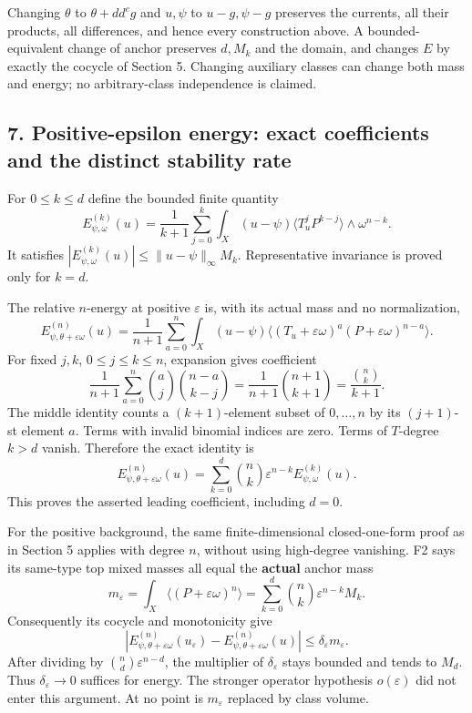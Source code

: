 \documentclass[
  10pt,
]{article}
\begin{document}
Changing \(\theta\) to \(\theta+dd^cg\) and \(u,\psi\) to \(u-g,\psi-g\)
preserves the currents, all their products, all differences, and hence
every construction above. A bounded-equivalent change of anchor
preserves \(d,M_k\) and the domain, and changes \(E\) by exactly the
cocycle of Section 5. Changing auxiliary classes can change both mass
and energy; no arbitrary-class independence is claimed.

\subsection{7. Positive-epsilon energy: exact coefficients and the
distinct stability
rate}\label{positive-epsilon-energy-exact-coefficients-and-the-distinct-stability-rate}

For \(0\leq k\leq d\) define the bounded finite quantity \[
E^{(k)}_{\psi,\omega}(u)=\frac1{k+1}\sum_{j=0}^k\int_X(u-\psi)
\langle T_u^jP^{k-j}\rangle\wedge\omega^{n-k}.
\] It satisfies \(|E^{(k)}_{\psi,\omega}(u)|\leq\|u-\psi\|_\infty M_k\).
Representative invariance is proved only for \(k=d\).

The relative \(n\)-energy at positive \(\varepsilon\) is, with its
actual mass and no normalization, \[
E^{(n)}_{\psi,\theta+\varepsilon\omega}(u)
=\frac1{n+1}\sum_{a=0}^n\int_X(u-\psi)
\langle(T_u+\varepsilon\omega)^a(P+\varepsilon\omega)^{n-a}\rangle.
\] For fixed \(j,k\), \(0\leq j\leq k\leq n\), expansion gives
coefficient \[
\frac1{n+1}\sum_{a=0}^n\binom aj\binom{n-a}{k-j}
=\frac1{n+1}\binom{n+1}{k+1}
=\frac{\binom nk}{k+1}.
\] The middle identity counts a \((k+1)\)-element subset of
\({0,\ldots,n}\) by its \((j+1)\)-st element \(a\). Terms with invalid
binomial indices are zero. Terms of \(T\)-degree \(k>d\) vanish.
Therefore the exact identity is \[
E^{(n)}_{\psi,\theta+\varepsilon\omega}(u)
=\sum_{k=0}^d\binom nk\varepsilon^{n-k}E^{(k)}_{\psi,\omega}(u).
\] This proves the asserted leading coefficient, including \(d=0\).

For the positive background, the same finite-dimensional closed-one-form
proof as in Section 5 applies with degree \(n\), without using
high-degree vanishing. F2 says its same-type top mixed masses all equal
the \textbf{actual} anchor mass \[
m_\varepsilon=\int_X\langle(P+\varepsilon\omega)^n\rangle
=\sum_{k=0}^d\binom nk\varepsilon^{n-k}M_k.
\] Consequently its cocycle and monotonicity give \[
|E^{(n)}_{\psi,\theta+\varepsilon\omega}(u_\varepsilon)
-E^{(n)}_{\psi,\theta+\varepsilon\omega}(u)|\leq\delta_\varepsilon m_\varepsilon.
\] After dividing by \(\binom nd\varepsilon^{n-d}\), the multiplier of
\(\delta_\varepsilon\) stays bounded and tends to \(M_d\). Thus
\(\delta_\varepsilon\to0\) suffices for energy. The stronger operator
hypothesis \(o(\varepsilon)\) did not enter this argument. At no point
is \(m_\varepsilon\) replaced by class volume.
\end{document}
